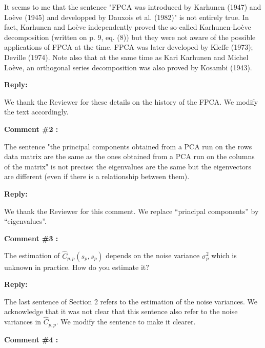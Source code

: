 \documentclass[11pt]{article}
\begin{document}
It seems to me that the sentence "FPCA was introduced by Karhunen (1947) and Loève (1945) and developped by Dauxois et al. (1982)" is not entirely true. In fact, Karhunen and Loève independently proved the so-called Karhunen-Loève decomposition (written on p. 9, eq. (8)) but they were not aware of the possible applications of FPCA at the time. FPCA was later developed by Kleﬀe (1973); Deville (1974). Note also that at the same time as Kari Karhunen and Michel Loève, an orthogonal series decomposition was also proved by Kosambi (1943).

\medskip

\normalfont

\textbf{Reply:} 

We thank the Reviewer for these details on the history of the FPCA. We modify the text accordingly.

\bigskip

\itshape

\textbf{Comment \#2 :}

The sentence "the principal components obtained from a PCA run on
the rows data matrix are the same as the ones obtained from a PCA run on the
columns of the matrix" is not precise: the eigenvalues are the same but the eigenvectors are diﬀerent (even if there is a relationship between them).

\medskip

\normalfont

\textbf{Reply:}

We thank the Reviewer for this comment. We replace ``principal components'' by ``eigenvalues''.

\bigskip

\itshape


\textbf{Comment \#3 :}

The estimation of $\widehat{C}_{p,p}(s_p,s_p)$ depends on the noise variance $\sigma^2_p$ which is unknown in practice. How do you estimate it?

\medskip

\normalfont

\textbf{Reply:}

The last sentence of Section 2 refers to the estimation of the noise variances. We acknowledge that it was not clear that this sentence also refer to the noise variances in $\widehat{C}_{p, p}$. We modify the sentence to make it clearer.

\bigskip


\itshape


\textbf{Comment \#4 :}
\end{document}
